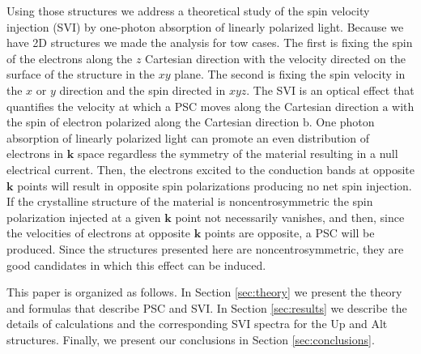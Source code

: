 \documentclass[prb,11pt,tightenlines,twocolumn,aps]{revtex4-1}
\begin{document}
Using those structures we address a theoretical study of the 
spin velocity
injection (SVI) 
by one-photon absorption of linearly polarized light.
% 
{
% 
Because we have 2D structures we made the analysis for tow cases. The first is
fixing the spin of the electrons along the $z$ Cartesian direction with the
velocity directed on the surface of the structure in the $xy$ plane. The second
is fixing the spin velocity in the $x$ or $y$ direction and the spin directed
in $xyz$.}
% 
The SVI is an optical effect that quantifies the velocity at which a PSC moves
along the Cartesian direction $\mathrm{a}$ with the spin of electron polarized
along the Cartesian direction $\mathrm{b}$. One photon absorption of linearly
polarized light can promote an even distribution of electrons in $\mathbf{k}$ space
regardless the symmetry of the material resulting in a 
null electrical current.\cite{bhatPRL05}
Then, the electrons excited to the conduction bands at opposite $\mathbf{k}$
points will result in opposite spin polarizations producing no net spin
injection.\cite{bhatPRL05} If the crystalline structure of the material is
noncentrosymmetric the spin polarization injected at a given $\mathbf{k}$ point
not necessarily 
 vanishes,\cite{alvaradoPRL85, schmiedeskampPRL88} 
and then, since the velocities of electrons at opposite $\mathbf{k}$ points are
opposite, a PSC will be produced. Since the structures presented
here are noncentrosymmetric, they are good candidates in which this effect can
be induced.

This paper is organized as follows. In Section \ref{sec:theory} we present the
theory and formulas that describe PSC and SVI. In Section \ref{sec:results} we
describe the details of calculations and the corresponding SVI spectra for the
Up and Alt structures. Finally, we present our conclusions in
Section \ref{sec:conclusions}.


\end{document}
